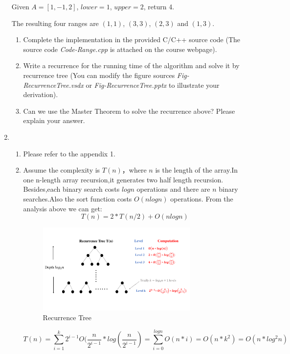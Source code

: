 \documentclass[12pt,a4paper]{article}
\makeatletter
\newtheorem*{solution}{Solution}
\theoremstyle{definition}
\renewenvironment{solution}[1][Solution] {\par\pushQED{\qed}\normalfont\topsep6\p@\@plus6\p@\relax\trivlist\item[\hskip\labelsep\bfseries#1\@addpunct{.}]\ignorespaces}{\popQED\endtrivlist\@endpefalse} \makeatother
\makeatother
\begin{document}
\begin{enumerate}
Given $A = [1,-1,2]$, $lower = 1$, $upper = 2$, return 4.

The resulting four ranges are $(1,1)$, $(3,3)$, $(2,3)$ and $(1,3)$.

\begin{enumerate}
\item
Complete the implementation in the provided C/C++ source code {\color{blue}(The source code \emph{Code-Range.cpp} is attached on the course webpage)}.
\item
Write a recurrence for the running time of the algorithm and solve it by recurrence tree {\color{blue}(You can modify the figure sources \emph{Fig-RecurrenceTree.vsdx} or \emph{Fig-RecurrenceTree.pptx} to illustrate your derivation)}.
\item
Can we use the Master Theorem to solve the recurrence above? Please explain your answer.
\end{enumerate}
\begin{solution}
~\par
\begin{enumerate}
\item Please refer to the appendix 1.
\item Assume the complexity is $T(n)$，where $n$ is the length of the array.In one n-length array recursion,it generates two half length recursion. Besides,each binary search costs $logn$ operations and there are $n$ binary searches.Also the sort function costs $O(nlogn)$ operations.
From the analysis above we can get:
\begin{equation}
    T(n)=2*T(n/2)+O(nlogn)
    \label{recursion}
\end{equation}
\begin{figure}[htbp]
    \centering
    \includegraphics[width=0.8\textwidth]{Fig-RecurrenceTree.pdf}
    \caption{Recurrence Tree}\label{Fig-RecurrenceTree}
\end{figure}
\begin{equation}
    T(n)=\sum_{i=1}^{k} 2^{i-1}O(\frac{n}{2^{i-1}}*log(\frac{n}{2^{i-1}})=\sum_{i=0}^{log  n}O(n*i)=O(n*k^2)=O(n*log^2n)

\end{equation}
\end{enumerate}
\end{solution}
\end{enumerate}
\end{document}
